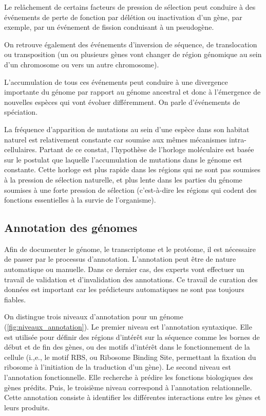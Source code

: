 \begin{refsegment}
    Le relâchement de certains facteurs de pression de sélection peut conduire à des événements de perte de fonction par délétion ou inactivation d’un gène, par exemple, par un événement de fission conduisant à un pseudogène.
    
    On retrouve également des événements d’inversion de séquence, de translocation ou transposition (un ou plusieurs gènes vont changer de région génomique au sein d’un chromosome ou vers un autre chromosome).
    
    L’accumulation de tous ces événements peut conduire à une divergence importante du génome par rapport au génome ancestral et donc à l’émergence de nouvelles espèces qui vont évoluer différemment. On parle d'événements de spéciation.
    
    La fréquence d'apparition de mutations au sein d'une espèce dans son habitat naturel est relativement constante car soumise aux mêmes mécanismes intra-cellulaires. Partant de ce constat, l'hypothèse de l’horloge moléculaire est basée sur le postulat que  laquelle l'accumulation de mutations dans le génome est constante. Cette horloge est plus rapide dans les régions qui ne sont pas soumises à la pression de sélection naturelle, et plus lente dans les parties du génome soumises à une forte pression de sélection (c'est-à-dire les régions qui codent des fonctions essentielles à la survie de l'organisme).
    
    
    \subsection{Annotation des génomes}\label{subsec:annotation}
    
    Afin de documenter le génome, le transcriptome et le protéome, il est nécessaire de passer par le processus d’annotation. L’annotation peut être de nature automatique ou manuelle. Dans ce dernier cas, des experts vont effectuer un travail de validation et d'invalidation des annotations. Ce travail de curation des données est important car les prédicteurs automatiques ne sont pas toujours fiables.
    
    On distingue trois niveaux d’annotation pour un génome (\cref{fig:niveaux_annotation}). Le premier niveau est l’annotation syntaxique. Elle est utilisée pour définir des régions d’intérêt sur la séquence comme les bornes de début et de fin des gènes, ou des motifs d’intérêt dans le fonctionnement de la cellule (i.,e., le motif RBS, ou Ribosome Binding Site, permettant la fixation du ribosome à l’initiation de la traduction d’un gène).  Le second niveau est l’annotation fonctionnelle. Elle recherche à prédire les fonctions biologiques des gènes prédits. Puis, le troisième niveau correspond à l’annotation relationnelle. Cette annotation consiste à identifier les différentes interactions entre les gènes et leurs produits.
    

\end{refsegment}
